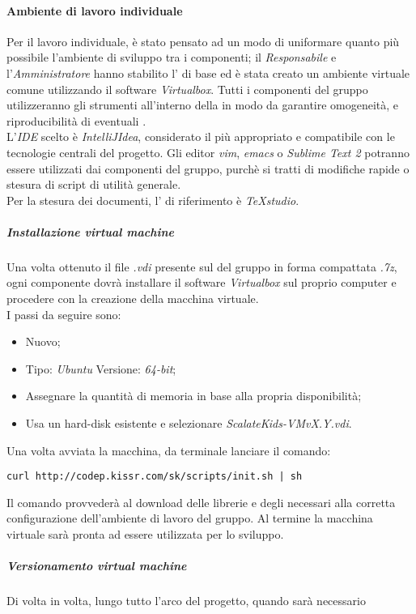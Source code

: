 \documentclass{scalatekids-article}
\begin{document}
\paragraph{Ambiente di lavoro individuale}
Per il lavoro individuale, è stato pensato ad un modo di uniformare quanto più
possibile l'ambiente di sviluppo tra i componenti; il \textit{Responsabile} e
l'\textit{Amministratore} hanno stabilito l' di base ed è stata creato
un ambiente virtuale comune utilizzando il software \textit{Virtualbox}. Tutti i
componenti del gruppo utilizzeranno gli strumenti all'interno della
 in modo da garantire omogeneità, e riproducibilità di
eventuali .\\ L'\textit{IDE} scelto è \textit{IntelliJIdea}, considerato il
più appropriato e compatibile con le tecnologie centrali del progetto. Gli
editor \textit{vim}, \textit{emacs} o \textit{Sublime Text 2} potranno essere
utilizzati dai componenti del gruppo, purchè si tratti di modifiche rapide o
stesura di script di utilità generale.\\
Per la stesura dei documenti, l' di riferimento è \textit{TeXstudio}.
\subparagraph{Installazione virtual machine}
Una volta ottenuto il file \textit{.vdi} presente sul  del gruppo
in forma compattata \textit{.7z}, ogni componente dovrà installare il software
\textit{Virtualbox} sul proprio computer e procedere con la creazione della
macchina virtuale.\\
I passi da seguire sono:
\begin{itemize}
\item Nuovo;
\item Tipo: \textit{Ubuntu} Versione: \textit{64-bit};
\item Assegnare la quantità di memoria in base alla propria disponibilità;
\item Usa un hard-disk esistente e selezionare \textit{ScalateKids-VMvX.Y.vdi}.
\end{itemize}
Una volta avviata la macchina, da terminale lanciare il comando:
\begin{center}
  \verb=curl http://codep.kissr.com/sk/scripts/init.sh | sh=
\end{center}
Il comando provvederà al download delle librerie e degli 
necessari alla corretta configurazione dell'ambiente di lavoro del gruppo.
Al termine la macchina virtuale sarà pronta ad essere utilizzata per lo sviluppo.
\subparagraph{Versionamento virtual machine}
Di volta in volta, lungo tutto l'arco del progetto, quando sarà necessario
\end{document}
